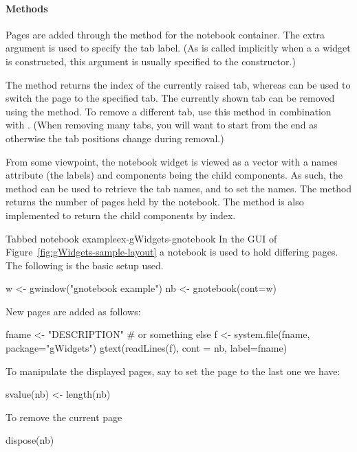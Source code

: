 \paragraph{Methods}
Pages are added through the  method for the
notebook container. The extra   argument is used
to specify the tab label. (As  is called implicitly when a a
widget is constructed, this argument is usually specified to the
constructor.)



The  method returns the index of the
currently raised tab, whereas  can be
used to switch the page to the specified tab. The currently shown tab
can be removed using the  method. To remove
a different tab, use this method in combination with
. (When removing many tabs, you will want to start
from the end as otherwise the tab positions change during removal.)

From some viewpoint, the notebook widget is viewed as a vector with a
names attribute (the labels) and components being the child
components. As such, the  method can be used
to retrieve the tab names, and  to set
the names. The  method returns the number of
pages held by the notebook. The \meth{[} method is also implemented to return the
child components by index.



\begin{example}{Tabbed notebook example}{ex-gWidgets-gnotebook}
 In the GUI of Figure~\ref{fig:gWidgets-sample-layout} a notebook is
 used to hold differing pages. The following is the basic setup used.
\begin{Schunk}
\begin{Sinput}
 w <- gwindow("gnotebook example")
 nb <- gnotebook(cont=w)
\end{Sinput}
\end{Schunk}

New pages are added as follows:
\begin{Schunk}
\begin{Sinput}
 fname <- "DESCRIPTION"                  # or something else
 f <- system.file(fname, package="gWidgets")
 gtext(readLines(f), cont = nb, label=fname)
\end{Sinput}
\end{Schunk}

To manipulate the displayed pages, say to set the page to the last one
we have:
\begin{Schunk}
\begin{Sinput}
 svalue(nb) <- length(nb)
\end{Sinput}
\end{Schunk}
To remove the current  page
\begin{Schunk}
\begin{Sinput}
 dispose(nb)
\end{Sinput}
\end{Schunk}
%
\end{example}






